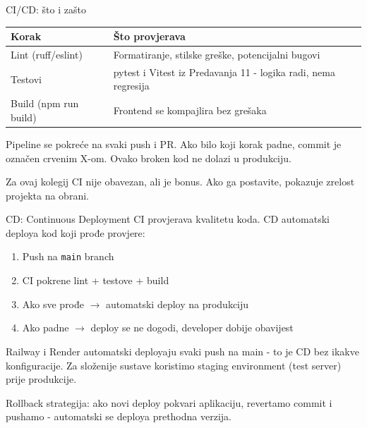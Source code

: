 \begin{frame}{CI/CD: što i zašto}
\begin{tabular}{@{}lp{10cm}@{}}
  \toprule
  \textbf{Korak} & \textbf{Što provjerava} \\
  \midrule
  Lint (ruff/eslint) & Formatiranje, stilske greške, potencijalni bugovi \\
  Testovi & pytest i Vitest iz Predavanja 11 - logika radi, nema regresija \\
  Build (npm run build) & Frontend se kompajlira bez grešaka \\
  \bottomrule
\end{tabular}

\vspace{0.6em}
Pipeline se pokreće na svaki push i PR. Ako bilo koji korak padne, commit je označen crvenim X-om. Ovako broken kod ne dolazi u produkciju.

\vspace{0.4em}
Za ovaj kolegij CI nije obavezan, ali je bonus. Ako ga postavite, pokazuje zrelost projekta na obrani.
\end{frame}

\begin{frame}{CD: Continuous Deployment}
CI provjerava kvalitetu koda. CD automatski deploya kod koji prođe provjere:

\vspace{0.4em}
\begin{enumerate}
  \item Push na \texttt{main} branch
  \item CI pokrene lint + testove + build
  \item Ako sve prođe $\rightarrow$ automatski deploy na produkciju
  \item Ako padne $\rightarrow$ deploy se ne dogodi, developer dobije obavijest
\end{enumerate}

\vspace{0.6em}
Railway i Render automatski deployaju svaki push na main - to je CD bez ikakve konfiguracije. Za složenije sustave koristimo staging environment (test server) prije produkcije.

\vspace{0.4em}
Rollback strategija: ako novi deploy pokvari aplikaciju, revertamo commit i pushamo - automatski se deploya prethodna verzija.
\end{frame}

